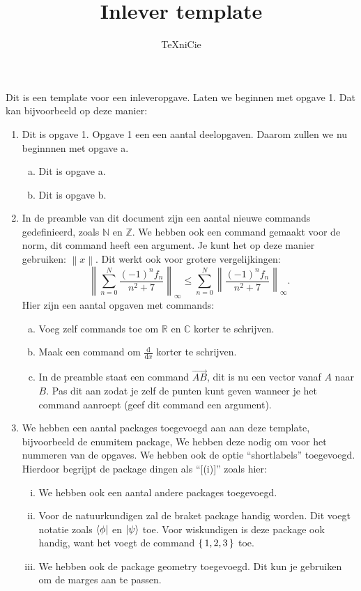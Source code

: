 \documentclass[a4paper]{article}
\title{Inlever template}
\author{\TeX niCie}
\newcommand{\N}{\mathbb{N}}
\newcommand{\Z}{\mathbb{Z}}
\newcommand{\norm}[1]{ \left\| #1 \right\| }
\newcommand{\pointsvector}{\overrightarrow{AB}}
\begin{document}
\maketitle

Dit is een template voor een inleveropgave. 
Laten we beginnen met opgave 1. 
Dat kan bijvoorbeeld op deze manier: 

\begin{enumerate}[1.]
    \item Dit is opgave 1. Opgave 1 een een aantal deelopgaven. 
    Daarom zullen we nu beginnnen met opgave a.
    \begin{enumerate}[a)]
        \item Dit is opgave a. 
        \item Dit is opgave b.
    \end{enumerate}

    \item In de preamble van dit document zijn een aantal nieuwe 
    commands gedefinieerd, zoals $\N$ en $\Z$. 
    We hebben ook een command gemaakt voor de norm, 
    dit command heeft een argument. 
    Je kunt het op deze manier gebruiken: $\norm{x}$.
    Dit werkt ook voor grotere vergelijkingen:
    \[ \norm{\sum_{n=0}^N \frac{(-1)^nf_n}{n^2 + 7}}_{\infty} \leq 
    \sum_{n=0}^N \norm{\frac{(-1)^nf_n}{n^2 + 7}}_{\infty}.  \]
    Hier zijn een aantal opgaven met commands: 
    \begin{enumerate}[(a)]
        \item Voeg zelf commands toe om $\mathbb{R}$
            en $\mathbb{C}$ korter te schrijven.
        \item Maak een command om $\frac{\mathrm{d}}{\mathrm{d}x}$ 
            korter te schrijven.
        \item In de preamble staat een command $\pointsvector$, dit is nu een vector 
            vanaf $A$ naar $B$. 
            Pas dit aan zodat je zelf de punten kunt geven 
            wanneer je het command aanroept (geef dit command een argument).
    \end{enumerate}


    \item We hebben een aantal packages toegevoegd aan
    aan deze template, bijvoorbeeld de enumitem package, 
    We hebben deze nodig om voor het nummeren van de opgaves. 
    We hebben ook de optie ``shortlabels'' toegevoegd. 
    Hierdoor begrijpt de package dingen als ``[(i)]'' zoals hier:
    \begin{enumerate}[(i)]
        \item We hebben ook een aantal andere packages toegevoegd. 
        \item Voor de natuurkundigen zal de braket package handig worden. 
            Dit voegt notatie zoals $\bra{\phi}$ en $\ket{\psi}$ toe. 
            Voor wiskundigen is deze package ook handig, want het voegt 
            de command $\set{1,2,3}$ toe. 
        \item We hebben ook de package geometry toegevoegd. 
            Dit kun je gebruiken om de marges aan te passen. 
    \end{enumerate}


\end{enumerate}
\end{document}
